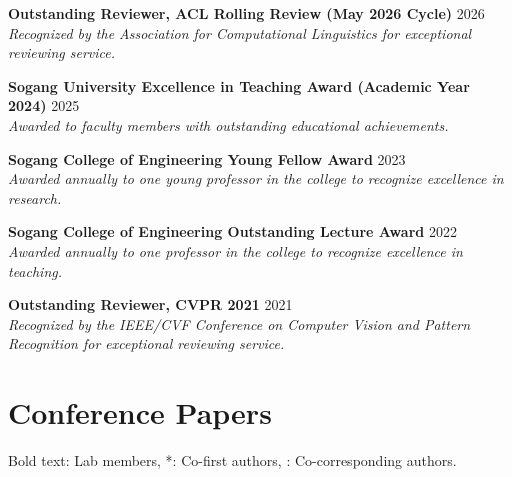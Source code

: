 \documentclass[letterpaper,11pt]{article}
\begin{document}
\textbf{Outstanding Reviewer, ACL Rolling Review (May 2026 Cycle)} \hfill 2026 \\
\textit{Recognized by the Association for Computational Linguistics for exceptional reviewing service.}\\
\vspace{0.1cm}

\textbf{Sogang University Excellence in Teaching Award (Academic Year 2024)} \hfill 2025 \\
\textit{Awarded to faculty members with outstanding educational achievements.}\\
\vspace{0.1cm}

\textbf{Sogang College of Engineering Young Fellow Award} \hfill 2023 \\
\textit{Awarded annually to one young professor in the college to recognize excellence in research.}\\
\vspace{0.1cm}

\textbf{Sogang College of Engineering Outstanding Lecture Award} \hfill 2022 \\
\textit{Awarded annually to one professor in the college to recognize excellence in teaching.}\\
\vspace{0.1cm}

\textbf{Outstanding Reviewer, CVPR 2021} \hfill 2021 \\
\textit{Recognized by the IEEE/CVF Conference on Computer Vision and Pattern Recognition for exceptional reviewing service.}

\section{Conference Papers}
\small{Bold text: Lab members, *: Co-first authors, \textdagger: Co-corresponding authors.}
\end{document}
